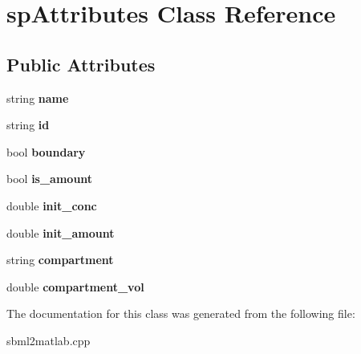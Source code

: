 \hypertarget{classsp_attributes}{\section{sp\-Attributes Class Reference}
\label{classsp_attributes}
}
\subsection*{Public Attributes}
\begin{DoxyCompactItemize}
\item 
\hypertarget{classsp_attributes_a3c12c7a2c62b4bbcee8f2d0690b19ac6}{string {\bfseries name}}\label{classsp_attributes_a3c12c7a2c62b4bbcee8f2d0690b19ac6}

\item 
\hypertarget{classsp_attributes_a2d06ca3e8d7a60589b5cfc659d2057fc}{string {\bfseries id}}\label{classsp_attributes_a2d06ca3e8d7a60589b5cfc659d2057fc}

\item 
\hypertarget{classsp_attributes_abd1de96b8947b10f264cbce3d3b9bd19}{bool {\bfseries boundary}}\label{classsp_attributes_abd1de96b8947b10f264cbce3d3b9bd19}

\item 
\hypertarget{classsp_attributes_a81fcd6209e08d8f58cf5f0add37a5218}{bool {\bfseries is\-\_\-amount}}\label{classsp_attributes_a81fcd6209e08d8f58cf5f0add37a5218}

\item 
\hypertarget{classsp_attributes_a5effa128ee08000579cd512324b03f5e}{double {\bfseries init\-\_\-conc}}\label{classsp_attributes_a5effa128ee08000579cd512324b03f5e}

\item 
\hypertarget{classsp_attributes_a7feb889c9cf6e2dc242a1e98d528a2a9}{double {\bfseries init\-\_\-amount}}\label{classsp_attributes_a7feb889c9cf6e2dc242a1e98d528a2a9}

\item 
\hypertarget{classsp_attributes_a23738edc5c7113c49c1ebf3e37dbf5c5}{string {\bfseries compartment}}\label{classsp_attributes_a23738edc5c7113c49c1ebf3e37dbf5c5}

\item 
\hypertarget{classsp_attributes_aa7933b272a8959a6f0f31217fe2129b4}{double {\bfseries compartment\-\_\-vol}}\label{classsp_attributes_aa7933b272a8959a6f0f31217fe2129b4}

\end{DoxyCompactItemize}


The documentation for this class was generated from the following file\-:\begin{DoxyCompactItemize}
\item 
sbml2matlab.\-cpp\end{DoxyCompactItemize}
